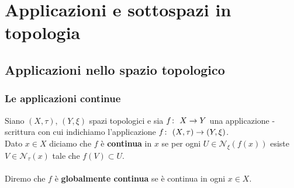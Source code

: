 \chapter{Applicazioni e sottospazi in topologia}
\section{Applicazioni nello spazio topologico}
\subsection{\textcolor{TopGener}{\textbf{Le applicazioni continue}}}



\begin{definition}
	Siano $(X,\tau)$, $(Y, \xi)$ spazi topologici e sia $f \colon\ X \rightarrow Y$ una applicazione - scrittura con cui indichiamo l'applicazione $f \colon\ (X,\tau) \rightarrow (Y,\xi)$. \\ Dato $x \in X$ diciamo che $f$ è \textbf{continua} in $x$ se per ogni $U \in \mathcal{N}_\xi(f(x))$ esiste $V \in \mathcal{N}_\tau(x)$ tale che $f(V) \subset U$. \\ \\Diremo che $f$ è \textbf{globalmente continua} se è continua in ogni $x \in X$.
\end{definition}


